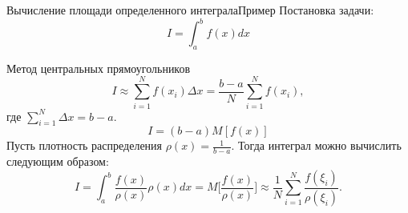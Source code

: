 \documentclass{beamer}
\begin{document}
	\begin{frame}{Вычисление площади определенного интеграла}{Пример}
		Постановка задачи:
		\[
		I = \int_{a}^{b} f(x) dx
		\]
		
		Метод центральных прямоугольников
		\[
		I 
		\approx 
		\sum_{i=1}^{N} f(x_i) \Delta x 
		=
		\frac{b-a}{N} \sum_{i=1}^{N} f(x_i)
		,
		\]
		где $\sum_{i=1}^{N} \Delta x = b - a$.
		\[
		I
		=
		(b - a) M [f(x)]
		\]
		Пусть плотность распределения $\rho(x) = \frac{1}{b-a}$. Тогда интеграл можно вычислить следующим образом:
		\[
		I
		= 
		\int_{a}^{b} \frac{f(x)}{\rho(x)} \rho(x) dx
		= 
		M \Bigg[\frac{f(x)}{\rho(x)}\Bigg] 
		\approx
		\frac{1}{N} \sum_{i=1}^{N} \frac{f(\xi_i)}{\rho(\xi_i)}
		.
		\]
	\end{frame}
\end{document}
